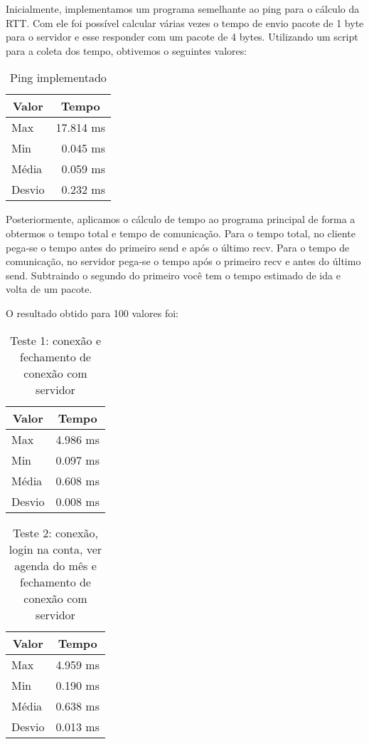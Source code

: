 \documentclass[10pt,a4paper]{article}
\begin{document}
Inicialmente, implementamos um programa semelhante ao ping para o
cálculo da RTT. Com ele foi possível calcular várias vezes o tempo de envio pacote
de 1 byte para o servidor e esse responder com um pacote de 4
bytes. Utilizando um script para a coleta dos tempo, obtivemos o
seguintes valores:

\begin{table}[h!]
\caption{Ping implementado}
\begin{center}
  \begin{tabular}{lr}
    \multicolumn{1}{c}{Valor} & \multicolumn{1}{c}{Tempo}\\
    \hline
    Max & 17.814 ms\\
    Min & 0.045 ms\\
    Média & 0.059 ms \\
    Desvio & 0.232 ms
  \end{tabular}

\end{center}
\end{table}

Posteriormente, aplicamos o cálculo de tempo ao programa principal de
forma a obtermos o tempo total e tempo de comunicação.
Para o tempo total, no cliente pega-se  o tempo antes do primeiro send e após o último recv.
Para o tempo de comunicação, no servidor pega-se o tempo após o
primeiro recv e antes do último send.
Subtraindo o segundo do primeiro você tem o tempo estimado de ida e
volta de um pacote. 

O resultado obtido para 100 valores foi:

\begin{table}[h!]
\caption{Teste 1: conexão e fechamento de conexão com servidor}
\begin{center}
  \begin{tabular}{lr}
    \multicolumn{1}{c}{Valor} & \multicolumn{1}{c}{Tempo}\\
    \hline
    Max & 4.986 ms\\
    Min & 0.097 ms\\
    Média & 0.608 ms \\
    Desvio & 0.008 ms
  \end{tabular}

\end{center}
\end{table}

\begin{table}[h!]
\caption{Teste 2: conexão, login na conta, ver agenda do mês e fechamento de conexão com servidor}
\begin{center}
  \begin{tabular}{lr}
    \multicolumn{1}{c}{Valor} & \multicolumn{1}{c}{Tempo}\\
    \hline
    Max & 4.959 ms\\
    Min & 0.190 ms\\
    Média & 0.638 ms \\
    Desvio & 0.013 ms
  \end{tabular}

\end{center}
\end{table}
\end{document}
